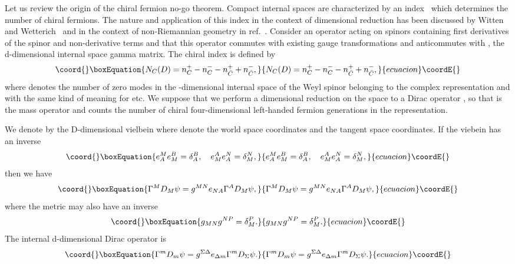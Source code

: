 \documentclass[a4paper,12pt]{article}
\begin{document}
Let us review the origin of the chiral fermion no-go theorem. Compact
internal spaces are characterized by an index~\cite{Atiyah} which
determines the number of chiral fermions. The nature and application of
this index in the context of dimensional reduction has been discussed by
Witten and Wetterich~\cite{Witten,Wetterich} and in the context of
non-Riemannian geometry in ref.~\cite{Moffat}. Consider an
operator \coordHE{} acting on spinors containing first derivatives of
the spinor and non-derivative terms and that this operator
commutes with existing gauge transformations and anticommutes
with \coordHE{}, the d-dimensional internal space gamma matrix.
The chiral index is defined by
\begin{equation}\coord{}\boxEquation{
N_C(D)=n^+_C-n^-_C-n^+_{\bar C}+n^-_{\bar C},
}{
N_C(D)=n^+_C-n^-_C-n^+_{\bar C}+n^-_{\bar C},
}{ecuacion}\coordE{}\end{equation}
where \coordHE{} denotes the number of zero modes in the
\coordHE{}-dimensional internal space of the Weyl spinor \myHighlight{$\psi^+$}\coordHE{}
belonging to the complex representation \coordHE{} and with the same
kind of meaning for \coordHE{} etc. We suppose that we
perform a dimensional reduction on the \coordHE{} space to a Dirac
operator \coordHE{}, so that \coordHE{} is the mass operator and \coordHE{}
counts the number of chiral four-dimensional left-handed fermion
generations in the \coordHE{} representation.

We denote by \coordHE{} the D-dimensional vielbein where \coordHE{} denote the
world space coordinates and \coordHE{} the tangent space coordinates. If the
viebein has an inverse
\begin{equation}\coord{}\boxEquation{
e^M_Ae^B_M=\delta^B_A,\quad e^A_Me^N_A=\delta^N_M,
}{
e^M_Ae^B_M=\delta^B_A,\quad e^A_Me^N_A=\delta^N_M,
}{ecuacion}\coordE{}\end{equation}
then we have
\begin{equation}\coord{}\boxEquation{
\Gamma^MD_M\psi=g^{MN}e_{NA}\Gamma^AD_M\psi,
}{
\Gamma^MD_M\psi=g^{MN}e_{NA}\Gamma^AD_M\psi,
}{ecuacion}\coordE{}\end{equation}
where the metric \coordHE{} may also have an inverse
\begin{equation}\coord{}\boxEquation{
g_{MN}g^{NP}=\delta_M^P.
}{
g_{MN}g^{NP}=\delta_M^P.
}{ecuacion}\coordE{}\end{equation}
The internal d-dimensional Dirac operator is
\begin{equation}\coord{}\boxEquation{
\Gamma^mD_m\psi=g^{\Sigma\Delta}e_{\Delta m}\Gamma^mD_\Sigma\psi.
}{
\Gamma^mD_m\psi=g^{\Sigma\Delta}e_{\Delta m}\Gamma^mD_\Sigma\psi.
}{ecuacion}\coordE{}\end{equation}
\end{document}

